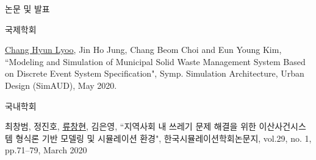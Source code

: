 \documentclass{resume} %
\begin{document}
\begin{rSection}{논문 및 발표}

\begin{rSubsection}{국제학회}{}{}{}
\item {\underline{Chang Hyun Lyoo},  Jin Ho Jung, Chang Beom Choi and Eun Young Kim, ``Modeling and Simulation of Municipal Solid Waste Management System Based on Discrete Event System Specification", Symp. Simulation 
Architecture, Urban Design (SimAUD), May 2020.}
\end{rSubsection}

\begin{rSubsection}{국내학회}{}{}{}
\item {최창범, 정진호, \underline{류창현}, 김은영, ``지역사회 내 쓰레기 문제 해결을 위한 이산사건시스템 형식론 기반 모델링 및 시뮬레이션 환경", 한국시뮬레이션학회논문지, vol.29, no. 1, pp.71--79, March 2020}
\end{rSubsection}

\end{rSection}
\end{document}
